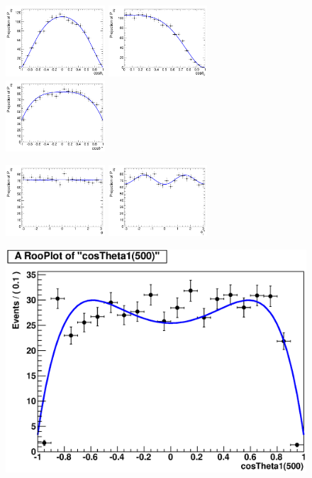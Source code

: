 \begin{figure}[htb!]
\begin{center}
\centerline{
\includegraphics[width=0.33\textwidth]{presentation/defense/images/plots/sigPDF_CosTheta1proj_500.pdf}
\includegraphics[width=0.33\textwidth]{presentation/defense/images/plots/sigPDF_CosTheta2proj_500.pdf}
\includegraphics[width=0.33\textwidth]{presentation/defense/images/plots/sigPDF_CosThetaSproj_500.pdf}
}
\centerline{
\includegraphics[width=0.33\textwidth]{presentation/defense/images/plots/sigPDF_Phiproj_500.pdf}
\includegraphics[width=0.33\textwidth]{presentation/defense/images/plots/sigPDF_PhiStar1proj_500.pdf}
}
\centerline{
\includegraphics[width=0.33\linewidth]{Optimization/poly_fit/costheta1/500.eps}
}
\end{center}
\end{figure}
